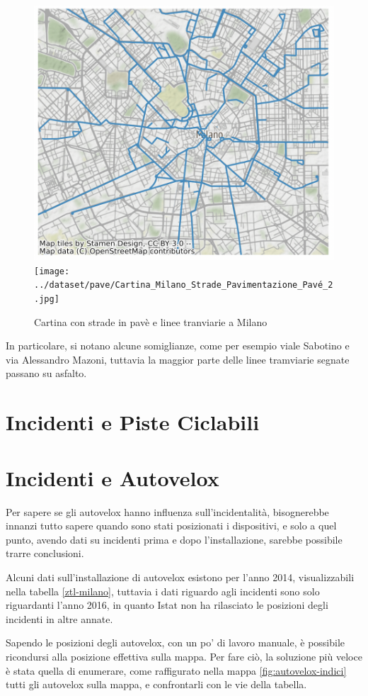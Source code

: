 \documentclass[a4paper]{report}
\begin{document}
\begin{figure}
    \includegraphics[width=0.5\linewidth]{../src/tram/tram.png}
    \texttt{[image: ../dataset/pave/Cartina\_Milano\_Strade\_Pavimentazione\_Pavé\_2.jpg]}
    \caption{Cartina con strade in pavè e linee tranviarie a Milano}
    \label{fig:tram-pave-milano}
\end{figure}

In particolare, si notano alcune somiglianze, come per esempio viale Sabotino e via Alessandro Mazoni, 
tuttavia la maggior parte delle linee tramviarie segnate passano su asfalto.


\section{Incidenti e Piste  Ciclabili}


\section{Incidenti e Autovelox}

Per sapere se gli autovelox hanno influenza sull'incidentalità, 
bisognerebbe innanzi tutto sapere quando sono stati posizionati i dispositivi, e solo a quel punto, 
avendo dati su incidenti prima e dopo l'installazione, sarebbe possibile trarre conclusioni.

Alcuni dati sull'installazione di autovelox esistono per l'anno 2014, visualizzabili nella 
tabella \ref{ztl-milano}, tuttavia i dati 
riguardo agli incidenti sono solo riguardanti l'anno 2016, in quanto Istat non ha rilasciato 
le posizioni degli incidenti in altre annate.

Sapendo le posizioni degli autovelox, con un po' di lavoro manuale, è possibile ricondursi alla 
posizione effettiva sulla mappa.
Per fare ciò, la soluzione più veloce è stata quella di enumerare, 
come raffigurato nella mappa \ref{fig:autovelox-indici} tutti gli autovelox sulla mappa, 
e confrontarli con le vie della tabella.
\end{document}
